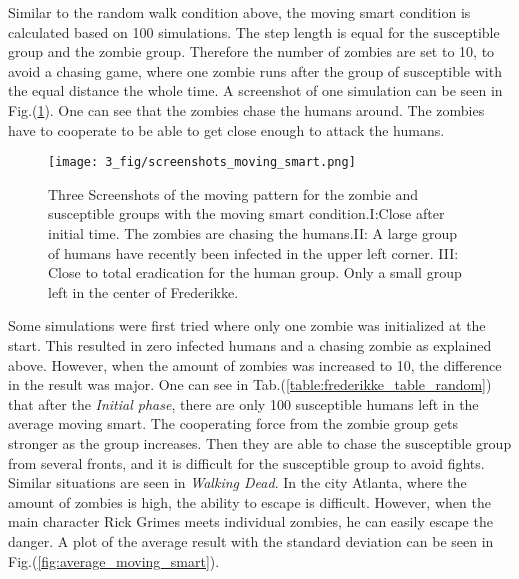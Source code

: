 \documentclass[%
twoside,                 %
final,                   %
chapterprefix=true,      %
open=right               %
10pt]{book}
\begin{document}
\vspace{3mm}




\vspace{3mm}


Similar to the random walk condition above, the moving smart condition is calculated based on 100 simulations. The step length is equal for the susceptible group and the zombie group. Therefore the number of zombies are set to 10, to avoid a chasing game, where one zombie runs after the group of susceptible with the equal distance the whole time. A screenshot of one simulation can be seen in Fig.(\ref{fig:screenshot_moving_smart}). One can see that the zombies chase the humans around. The zombies have to cooperate to be able to get close enough to attack the humans.  


\vspace{3mm}




\vspace{3mm}




\begin{figure}[ht]
  \centerline{\texttt{[image: 3\_fig/screenshots\_moving\_smart.png]}}
  \caption{
  \label{fig:screenshot_moving_smart} Three Screenshots of the moving pattern for the zombie and susceptible groups with the moving smart condition.I:Close after initial time. The zombies are chasing the humans.II: A large group of humans have recently been infected in the upper left corner. III: Close to total eradication for the human group. Only a small group left in the center of Frederikke.
  }
\end{figure}


Some simulations were first tried where only one zombie was initialized at the start. This resulted in zero infected humans and a chasing zombie as explained above. However, when the amount of zombies was increased to 10, the difference in the result was major. One can see in Tab.(\ref{table:frederikke_table_random}) that after the \emph{Initial phase}, there are only 100 susceptible humans left in the average moving smart. The cooperating force from the zombie group gets stronger as the group increases. Then they are able to chase the susceptible group from several fronts, and it is difficult for the susceptible group to avoid fights. Similar situations are seen in \emph{Walking Dead}. In the city Atlanta, where the amount of zombies is high, the ability to escape is difficult. However, when the main character Rick Grimes meets individual zombies, he can easily escape the danger. A plot of the average result with the standard deviation can be seen in Fig.(\ref{fig:average_moving_smart}). 
\end{document}
